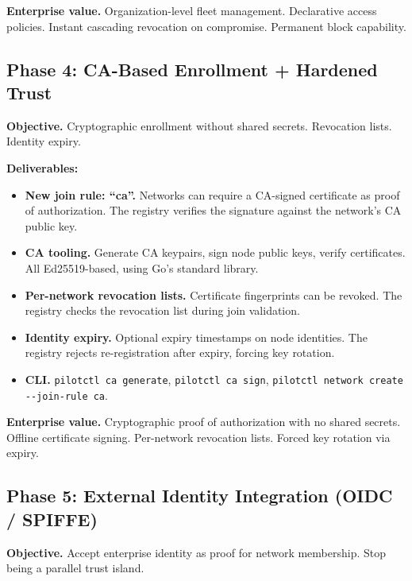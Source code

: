 \documentclass[11pt,a4paper]{article}
\begin{document}
\textbf{Enterprise value.} Organization-level fleet management. Declarative access policies. Instant cascading revocation on compromise. Permanent block capability.

\subsection{Phase 4: CA-Based Enrollment + Hardened Trust}

\textbf{Objective.} Cryptographic enrollment without shared secrets. Revocation lists. Identity expiry.

\textbf{Deliverables:}
\begin{itemize}
    \item \textbf{New join rule: ``ca''.} Networks can require a CA-signed certificate as proof of authorization. The registry verifies the signature against the network's CA public key.
    \item \textbf{CA tooling.} Generate CA keypairs, sign node public keys, verify certificates. All Ed25519-based, using Go's standard library.
    \item \textbf{Per-network revocation lists.} Certificate fingerprints can be revoked. The registry checks the revocation list during join validation.
    \item \textbf{Identity expiry.} Optional expiry timestamps on node identities. The registry rejects re-registration after expiry, forcing key rotation.
    \item \textbf{CLI.} \texttt{pilotctl ca generate}, \texttt{pilotctl ca sign}, \texttt{pilotctl network create -{}-join-rule ca}.
\end{itemize}

\textbf{Enterprise value.} Cryptographic proof of authorization with no shared secrets. Offline certificate signing. Per-network revocation lists. Forced key rotation via expiry.

\subsection{Phase 5: External Identity Integration (OIDC / SPIFFE)}

\textbf{Objective.} Accept enterprise identity as proof for network membership. Stop being a parallel trust island.
\end{document}
